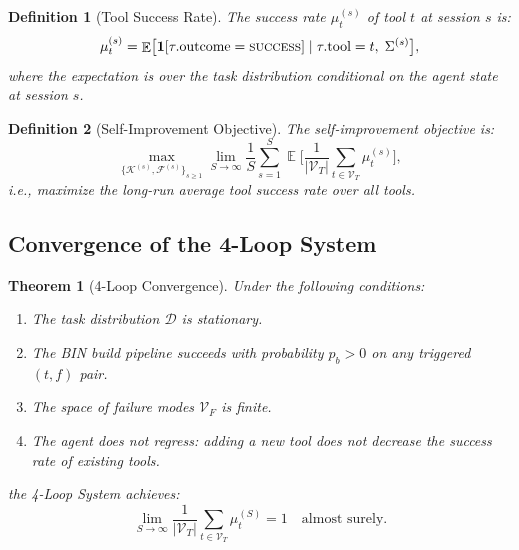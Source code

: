 \documentclass[11pt]{article}
\newtheorem{theorem}{Theorem}
\newtheorem{definition}{Definition}
\DeclareMathOperator{\E}{\mathbb{E}}
\begin{document}
\begin{definition}[Tool Success Rate]
\label{def:success_rate}
The success rate $\mu_t^{(s)}$ of tool $t$ at session $s$ is:
\begin{equation}
\mu_t^{(s)} = \E\bigl[\mathbf{1}[\tau.\text{outcome}=\textsc{success}]
               \mid \tau.\text{tool}=t,\; \Sigma^{(s)}\bigr],
\end{equation}
where the expectation is over the task distribution conditional on the agent
state at session $s$.
\end{definition}

\begin{definition}[Self-Improvement Objective]
\label{def:objective}
The self-improvement objective is:
\begin{equation}
\max_{\{\mathcal{K}^{(s)}, \mathcal{F}^{(s)}\}_{s \geq 1}} \lim_{S \to \infty}
\frac{1}{S} \sum_{s=1}^{S} \E\biggl[\frac{1}{|\mathcal{V}_T|} \sum_{t \in \mathcal{V}_T} \mu_t^{(s)}\biggr],
\end{equation}
i.e., maximize the long-run average tool success rate over all tools.
\end{definition}

\subsection{Convergence of the 4-Loop System}

\begin{theorem}[4-Loop Convergence]
\label{thm:convergence}
Under the following conditions:
\begin{enumerate}[leftmargin=1.5em, nosep]
    \item[\textbf{(A1)}] The task distribution $\mathcal{D}$ is stationary.
    \item[\textbf{(A2)}] The BIN build pipeline succeeds with probability $p_b > 0$
          on any triggered $(t,f)$ pair.
    \item[\textbf{(A3)}] The space of failure modes $\mathcal{V}_F$ is finite.
    \item[\textbf{(A4)}] The agent does not regress: adding a new tool does not
          decrease the success rate of existing tools.
\end{enumerate}
the 4-Loop System achieves:
\begin{equation}
\lim_{S \to \infty} \frac{1}{|\mathcal{V}_T|} \sum_{t \in \mathcal{V}_T} \mu_t^{(S)} = 1
\quad \text{almost surely.}
\end{equation}
\end{theorem}
\end{document}

